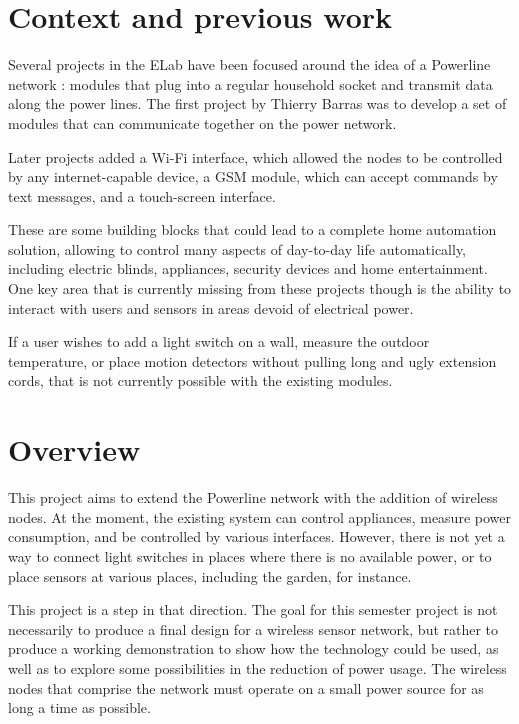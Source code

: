 \section{Context and previous work}

Several projects in the ELab have been focused around the idea of a Powerline
network : modules that plug into a regular household socket and transmit data
along the power lines. The first project by Thierry Barras\cite{barras2009} was
to develop a set of modules that can communicate together on the power network.

Later projects added a Wi-Fi interface\cite{sallin2010}, which allowed the nodes
to be controlled by any internet-capable device, a GSM module\cite{sallin2010},
which can accept commands by text messages, and a touch-screen interface.

These are some building blocks that could lead to a complete home automation
solution, allowing to control many aspects of day-to-day life automatically,
including electric blinds, appliances, security devices and home entertainment.
One key area that is currently missing from these projects though is the ability
to interact with users and sensors in areas devoid of electrical power.

If a user wishes to add a light switch on a wall, measure the outdoor
temperature, or place motion detectors without pulling long and ugly extension
cords, that is not currently possible with the existing modules.

\section{Overview}

This project aims to extend the Powerline network with the addition of wireless
nodes. At the moment, the existing system can control appliances, measure power
consumption, and be controlled by various interfaces. However, there is not yet
a way to connect light switches in places where there is no available power, or
to place sensors at various places, including the garden, for instance.

This project is a step in that direction. The goal for this semester project is
not necessarily to produce a final design for a wireless sensor network, but
rather to produce a working demonstration to show how the technology could be
used, as well as to explore some possibilities in the reduction of power usage.
The wireless nodes that comprise the network must operate on a small power
source for as long a time as possible.


